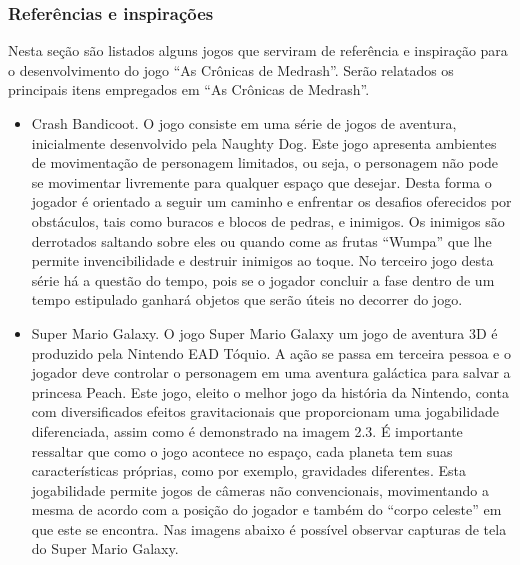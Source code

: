 \subsubsection{Referências e inspirações}
Nesta seção são listados alguns jogos que serviram de referência e inspiração 
para o desenvolvimento do jogo ``As Crônicas de Medrash''. Serão relatados os principais 
itens empregados em ``As Crônicas de Medrash''.

\begin{itemize}
\item Crash Bandicoot.
O jogo consiste 
em uma série de jogos de aventura, inicialmente desenvolvido pela Naughty Dog.
Este jogo apresenta ambientes de movimentação de personagem limitados, ou seja, 
o personagem não pode se movimentar livremente para qualquer espaço que desejar.
 Desta forma o jogador é orientado a seguir um caminho e enfrentar os desafios 
oferecidos por obstáculos, tais como buracos e blocos de pedras, e inimigos.
Os inimigos são derrotados saltando sobre eles ou quando come as frutas ``Wumpa'' que lhe 
permite invencibilidade e destruir inimigos ao toque.
No terceiro jogo desta série há a questão do tempo, pois se o jogador concluir a fase
 dentro de um tempo estipulado ganhará objetos que serão úteis no decorrer do jogo.



\item Super Mario Galaxy.
O jogo Super Mario Galaxy 
um jogo de aventura 3D é produzido pela Nintendo EAD Tóquio. A ação se passa 
em terceira pessoa e o jogador deve controlar o personagem em uma aventura 
galáctica para salvar a princesa Peach.
Este jogo, eleito o melhor jogo da história da Nintendo, conta com diversificados 
efeitos gravitacionais que proporcionam uma jogabilidade diferenciada, assim como 
é demonstrado na imagem 2.3. É importante ressaltar que como o jogo acontece no 
espaço, cada planeta tem suas características próprias, como por exemplo, 
gravidades diferentes. 
Esta jogabilidade permite jogos de câmeras não convencionais, movimentando a
 mesma de acordo com a posição do jogador e também do ``corpo celeste'' em que
 este se encontra.
Nas imagens abaixo é possível observar capturas de tela do Super Mario Galaxy.


\end{itemize}
